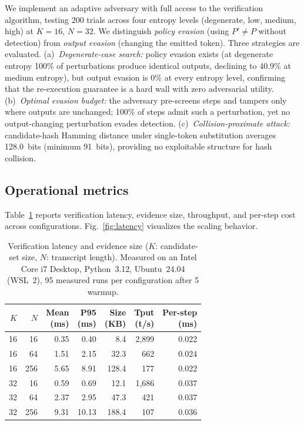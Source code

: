 \documentclass[conference]{IEEEtran}
\begin{document}
We implement an adaptive adversary with full access to the verification algorithm, testing 200 trials across four entropy levels (degenerate, low, medium, high) at $K\!=\!16$, $N\!=\!32$. We distinguish \emph{policy evasion} (using $P'\!\neq\!P$ without detection) from \emph{output evasion} (changing the emitted token). Three strategies are evaluated. (a)~\emph{Degenerate-case search:} policy evasion exists (at degenerate entropy 100\% of perturbations produce identical outputs, declining to 40.9\% at medium entropy), but output evasion is 0\% at every entropy level, confirming that the re-execution guarantee is a hard wall with zero adversarial utility. (b)~\emph{Optimal evasion budget:} the adversary pre-screens steps and tampers only where outputs are unchanged; 100\% of steps admit such a perturbation, yet no output-changing perturbation evades detection. (c)~\emph{Collision-proximate attack:} candidate-hash Hamming distance under single-token substitution averages 128.0~bits (minimum 91~bits), providing no exploitable structure for hash collision.

\subsection{Operational metrics}

Table~\ref{tab:latency} reports verification latency, evidence size, throughput, and per-step cost across configurations. Fig.~\ref{fig:latency} visualizes the scaling behavior.

\begin{table}[t]
\caption{Verification latency and evidence size ($K$: candidate-set size, $N$: transcript length). Measured on an Intel Core i7 Desktop, Python~3.12, Ubuntu~24.04 (WSL~2), 95 measured runs per configuration after 5 warmup.}\label{tab:latency}
\centering
\setlength{\tabcolsep}{3.0pt}
\begin{tabular}{@{}rrrrrrr@{}}
\toprule
$K$ & $N$ & \makecell{Mean\\(ms)} & \makecell{P95\\(ms)} & \makecell{Size\\(KB)} & \makecell{Tput\\(t/s)} & \makecell{Per-step\\(ms)} \\
\midrule
16 &  16 & 0.35 & 0.40 &  8.4 & 2{,}899 & 0.022 \\
16 &  64 & 1.51 & 2.15 & 32.3 &    662 & 0.024 \\
16 & 256 & 5.65 & 8.91 &128.4 &    177 & 0.022 \\
\midrule
32 &  16 & 0.59 & 0.69 & 12.1 & 1{,}686 & 0.037 \\
32 &  64 & 2.37 & 2.95 & 47.3 &    421 & 0.037 \\
32 & 256 & 9.31 &10.13 &188.4 &    107 & 0.036 \\
\bottomrule
\end{tabular}
\end{table}
\end{document}
